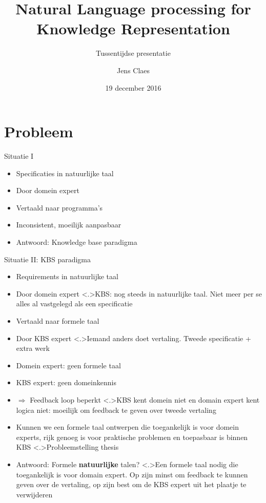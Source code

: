 \documentclass[notes]{beamer}
\title{Natural Language processing for Knowledge Representation}
\subtitle{Tussentijdse presentatie}
\author{Jens Claes}
\date{19 december 2016}
\newcommand{\seperation}{
	\vspace{1em}
	\ppause
}
\newcommand{\hitem}{
	\ppause
	\item
}
\newcommand{\ppause}{\onslide<+>}
\newcommand{\nnote}[1]{\note<.>{#1}}
\begin{document}
	\frame{\titlepage}
	\section{Probleem}
	\begin{frame}{Situatie I}
		\begin{itemize}
			\hitem Specificaties in natuurlijke taal
			\item Door domein expert
			
			\seperation
			
			\item Vertaald naar programma's
			\item Inconsistent, moeilijk aanpasbaar
			
			\seperation
			
			\item Antwoord: Knowledge base paradigma
		\end{itemize}
		
	\end{frame}
	\begin{frame}{Situatie II: KBS paradigma}
			\begin{itemize}
				\hitem Requirements in natuurlijke taal
				\item Door domein expert
				\nnote{KBS: nog steeds in natuurlijke taal. Niet meer per se alles al vastgelegd als een specificatie}
				
				\seperation
				
				\item Vertaald naar formele taal
				\item Door KBS expert
				\nnote{Iemand anders doet vertaling. Tweede specificatie + extra werk}
				
				\seperation
				
				\item Domein expert: geen formele taal
				\item KBS expert: geen domeinkennis
				\item $\Rightarrow$ Feedback loop beperkt
				\nnote{KBS kent domein niet en domain expert kent logica niet: moeilijk om feedback te geven over tweede vertaling}
				
				\seperation
				
				\item Kunnen we een formele taal ontwerpen die toegankelijk is voor domein experts, rijk genoeg is voor praktische problemen en toepasbaar is binnen KBS
				\nnote{Probleemstelling thesis}
				
				\seperation
				
				\item Antwoord: Formele \textbf{natuurlijke} talen?
				\nnote{Een formele taal nodig die toegankelijk is voor domain expert. Op zijn minst om feedback te kunnen geven over de vertaling, op zijn best om de KBS expert uit het plaatje te verwijderen}
			\end{itemize}
	\end{frame}
	
\end{document}
